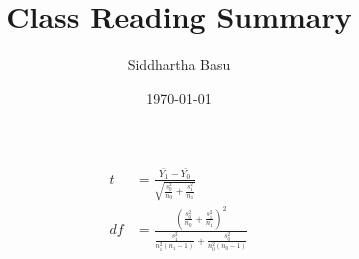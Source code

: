 \documentclass[12 pt, leqno]{article}
\begin{document}
\title{Class Reading Summary}
\author{Siddhartha Basu}
\date{\today}
\maketitle

\begin{align*}
t &= \frac{\bar{Y_1} - \bar{Y_0}}{\sqrt{\frac{s_0^2}{n_0} + \frac{s_1^2}{n_1}}} \\
df &= \frac{\left(\frac{s_0^2}{n_0} + \frac{s_1^2}{n_1}\right)^2}{\frac{s_1^2}{n_1^2(n_1 - 1)} + \frac{s_0^2}{n_0^2(n_0 - 1)}}
\end{align*}
\end{document}
